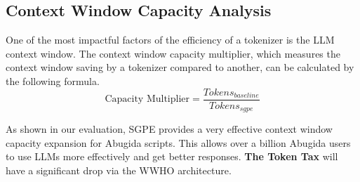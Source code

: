 \subsection{Context Window Capacity Analysis}
One of the most impactful factors of the efficiency of a tokenizer is the LLM context window. The context window capacity multiplier, which measures the context window saving by a tokenizer compared to another, can be calculated by the following formula.
$$ \text{Capacity Multiplier} = \frac{\text{$Tokens_{baseline}$}}{\text{$Tokens_{sgpe}$}} $$

\begin{table}[H]
\centering
\caption{Effective Context Window Capacity  Multiplier Comparison}
\label{tab:context_window_savings}
\end{table}

As shown in our evaluation, SGPE provides a very effective context window capacity expansion for Abugida scripts. This allows over a billion Abugida users to use LLMs more effectively and get better responses. \textbf{The Token Tax} will have a significant drop via the WWHO architecture.

